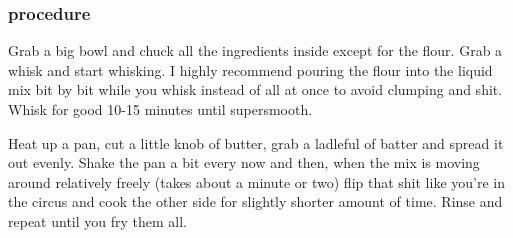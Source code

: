 \documentclass[10pt]{article}
\begin{document}
\subsubsection{procedure}%
\label{ssub:crepes_procedure}

Grab a big bowl and chuck all the ingredients inside except for the flour. Grab a whisk and start whisking. I highly recommend pouring the flour into the liquid mix bit by bit while you whisk instead of all at once to avoid clumping and shit. Whisk for good 10-15 minutes until supersmooth.

Heat up a pan, cut a little knob of butter, grab a ladleful of batter and spread it out evenly. Shake the pan a bit every now and then, when the mix is moving around relatively freely (takes about a minute or two) flip that shit like you're in the circus and cook the other side for slightly shorter amount of time. Rinse and repeat until you fry them all.
\end{document}
